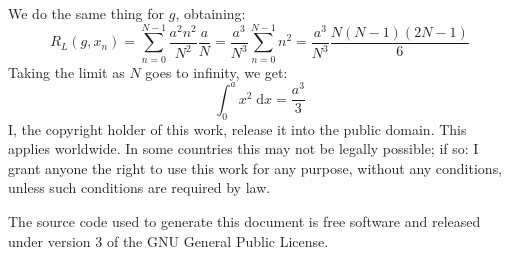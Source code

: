 \documentclass{article}
\theoremstyle{normal}
\theoremstyle{plain}
\begin{document}
    We do the same thing for $g$, obtaining:
    \begin{equation}
        R_{L}(g,x_{n})=\sum_{n=0}^{N-1}\frac{a^{2}n^{2}}{N^{2}}\frac{a}{N}
            =\frac{a^{3}}{N^{3}}\sum_{n=0}^{N-1}n^{2}
            =\frac{a^{3}}{N^{3}}\frac{N(N-1)(2N-1)}{6}
    \end{equation}
    Taking the limit as $N$ goes to infinity, we get:
    \begin{equation}
        \int_{0}^{a}x^{2}\;\textrm{d}x=\frac{a^{3}}{3}
    \end{equation}
    \newpage
    I, the copyright holder of this work, release it into the public domain.
    This applies worldwide. In some countries this may not be legally possible;
    if so: I grant anyone the right to use this work for any purpose, without
    any conditions, unless such conditions are required by law.
    \par\hfill\par
    The source code used to generate this document is free software and released
    under version 3 of the GNU General Public License.
\end{document}
